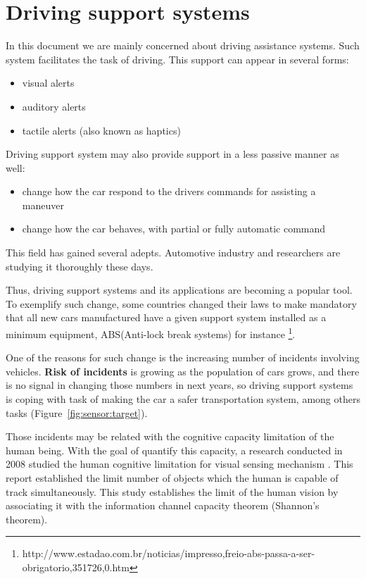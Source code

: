 \section{Driving support systems}

In this document we are mainly concerned about driving assistance systems. Such system facilitates the task of driving. This support can appear in several forms: 

\begin{itemize}
\item visual alerts
\item auditory alerts
\item tactile alerts (also known as haptics\cite{riener2010sensor})
\end{itemize}

Driving support system may also provide support in a less passive manner as well:

\begin{itemize}
\item change how the car respond to the drivers commands for assisting a maneuver
\item change how the car behaves, with partial or fully automatic command
\end{itemize}

This field has gained several adepts. Automotive industry and researchers are studying it thoroughly these days.

Thus, driving support systems and its applications are becoming a popular tool. To exemplify such change, some countries changed their laws to make mandatory that all new cars manufactured have a given support system installed as a minimum equipment, ABS(Anti-lock break systems)  for instance \footnote{http://www.estadao.com.br/noticias/impresso,freio-abs-passa-a-ser-obrigatorio,351726,0.htm}.

One of the reasons for such change is the increasing number of incidents involving vehicles. \textbf{Risk of incidents} is growing as the population of cars grows, and there is no signal in changing those numbers in next years, so driving support systems is coping with task of making the car a safer transportation system, among others tasks (Figure~\ref{fig:sensor:target}).

Those incidents may be related with the cognitive capacity limitation of the human being. With the goal of quantify this capacity, a research conducted in 2008 studied the human cognitive limitation for visual sensing mechanism \cite{LautarutisV}. This report established the limit number of objects which the human is capable of track simultaneously. This study establishes the limit of the human vision by associating it with the information channel capacity theorem (Shannon's theorem). 

